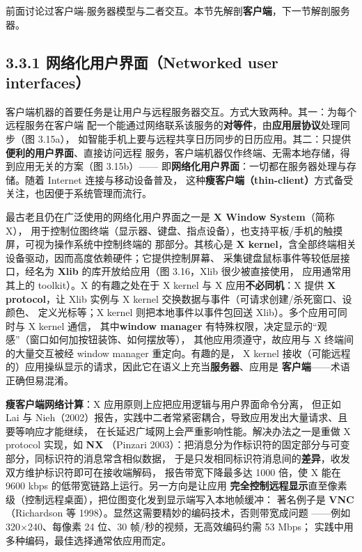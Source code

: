 

前面讨论过客户端-服务器模型与二者交互。本节先解剖\textbf{客户端}，下一节解剖服务器。

\subsection*{3.3.1 网络化用户界面（Networked user interfaces）}
客户端机器的首要任务是让用户与远程服务器交互。方式大致两种。其一：为每个远程服务在客户端
配一个能通过网络联系该服务的\textbf{对等件}，由\textbf{应用层协议}处理同步（图 3.15a），
如智能手机上要与远程共享日历同步的日历应用。其二：只提供\textbf{便利的用户界面}、直接访问远程
服务，客户端机器仅作终端、无需本地存储，得到应用无关的方案（图 3.15b）——
即\textbf{网络化用户界面}：一切都在服务器处理与存储。随着 Internet 连接与移动设备普及，
这种\textbf{瘦客户端（thin-client）}方式备受关注，也因便于系统管理而流行。

\medskip\noindent 最古老且仍在广泛使用的网络化用户界面之一是 \textbf{X Window System}（简称 X），
用于控制位图终端（显示器、键盘、指点设备），也支持平板/手机的触摸屏，可视为操作系统中控制终端的
那部分。其核心是 \textbf{X kernel}，含全部终端相关设备驱动，因而高度依赖硬件；它提供控制屏幕、
采集键盘鼠标事件等较低层接口，经名为 \textbf{Xlib} 的库开放给应用（图 3.16，Xlib 很少被直接使用，
应用通常用其上的 toolkit）。X 的有趣之处在于 X kernel 与 X 应用\textbf{不必同机}：X 提供
\textbf{X protocol}，让 Xlib 实例与 X kernel 交换数据与事件（可请求创建/杀死窗口、设颜色、
定义光标等；X kernel 则把本地事件以事件包回送 Xlib）。多个应用可同时与 X kernel 通信，
其中\textbf{window manager} 有特殊权限，决定显示的“观感”（窗口如何加按钮装饰、如何摆放等），
其他应用须遵守，故应用与 X 终端间的大量交互被经 window manager 重定向。有趣的是，
X kernel 接收（可能远程的）应用操纵显示的请求，因此它在语义上充当\textbf{服务器}、应用是
\textbf{客户端}——术语正确但易混淆。

\medskip\noindent\textbf{瘦客户端网络计算}：X 应用原则上应把应用逻辑与用户界面命令分离，
但正如 Lai 与 Nieh（2002）报告，实践中二者常紧密耦合，导致应用发出大量请求、且要等响应才能继续，
在长延迟广域网上会严重影响性能。解决办法之一是重做 X protocol 实现，如 \textbf{NX}
（Pinzari 2003）：把消息分为作标识符的固定部分与可变部分，同标识符的消息常含相似数据，
于是只发相同标识符消息间的\textbf{差异}，收发双方维护标识符即可在接收端解码，
报告带宽下降最多达 1000 倍，使 X 能在 9600 kbps 的低带宽链路上运行。另一方向是让应用
\textbf{完全控制远程显示}直至像素级（控制远程桌面），把位图变化发到显示端写入本地帧缓冲：
著名例子是 \textbf{VNC}（Richardson 等 1998）。显然这需要精妙的编码技术，否则带宽成问题
——例如 320×240、每像素 24 位、30 帧/秒的视频，无高效编码约需 53 Mbps；
实践中用多种编码，最佳选择通常依应用而定。


